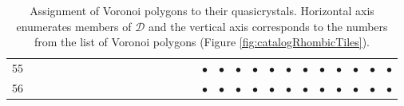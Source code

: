 \documentclass[text.tex]{subfiles}
\begin{document}
\begin{table}
{\begin{tabular}{l|ccccccccccccccccccccccccccc}
55  &           &           &           &           &           &           &           &           &           &           &           &           &           &           &           & $\bullet$ & $\bullet$ & $\bullet$ & $\bullet$ & $\bullet$ & $\bullet$ & $\bullet$ & $\bullet$ & $\bullet$ & $\bullet$ & $\bullet$ & $\bullet$ \\
56  &           &           &           &           &           &           &           &           &           &           &           &           &           &           &           & $\bullet$ & $\bullet$ & $\bullet$ & $\bullet$ & $\bullet$ & $\bullet$ & $\bullet$ & $\bullet$ & $\bullet$ & $\bullet$ & $\bullet$ & $\bullet$ \\
\bottomrule
\end{tabular}}
\caption{Assignment of Voronoi polygons to their quasicrystals. Horizontal axis enumerates members of $\mathcal{D}$ and the vertical axis corresponds to the numbers from the list of Voronoi polygons (Figure \ref{fig:catalogRhombicTiles}).}
\label{table:tiles1}
\end{table}

\restoregeometry
\end{document}
